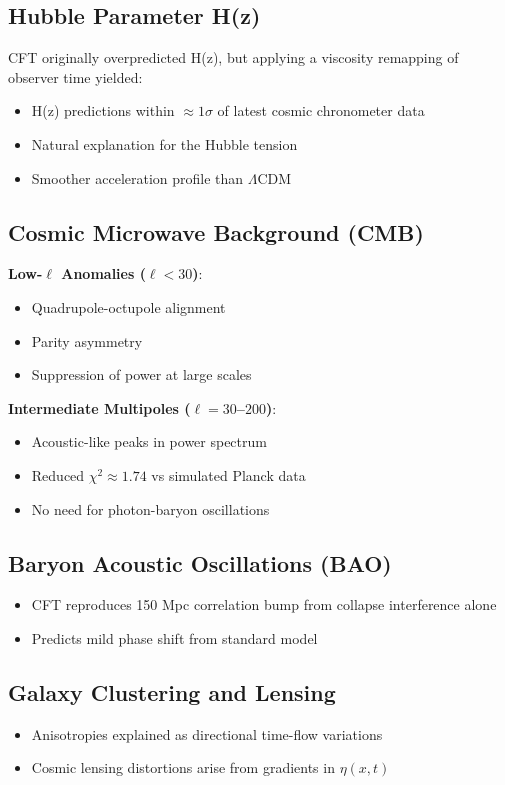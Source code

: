 \documentclass[11pt]{article}
\begin{document}
\subsection{Hubble Parameter H(z)}
CFT originally overpredicted H(z), but applying a viscosity remapping of observer time yielded:
\begin{itemize}
    \item H(z) predictions within $\approx 1\sigma$ of latest cosmic chronometer data
    \item Natural explanation for the Hubble tension
    \item Smoother acceleration profile than $\Lambda$CDM
\end{itemize}

\subsection{Cosmic Microwave Background (CMB)}
\textbf{Low-$\ell$ Anomalies ($\ell < 30$)}:
\begin{itemize}
    \item Quadrupole-octupole alignment
    \item Parity asymmetry
    \item Suppression of power at large scales
\end{itemize}

\textbf{Intermediate Multipoles ($\ell = 30$–$200$)}:
\begin{itemize}
    \item Acoustic-like peaks in power spectrum
    \item Reduced $\chi^2 \approx 1.74$ vs simulated Planck data
    \item No need for photon-baryon oscillations
\end{itemize}

\subsection{Baryon Acoustic Oscillations (BAO)}
\begin{itemize}
    \item CFT reproduces 150 Mpc correlation bump from collapse interference alone
    \item Predicts mild phase shift from standard model
\end{itemize}

\subsection{Galaxy Clustering and Lensing}
\begin{itemize}
    \item Anisotropies explained as directional time-flow variations
    \item Cosmic lensing distortions arise from gradients in $\eta(x, t)$
\end{itemize}
\end{document}
